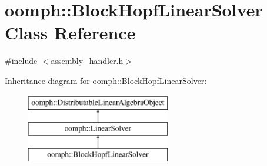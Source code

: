 \hypertarget{classoomph_1_1BlockHopfLinearSolver}{}\section{oomph\+:\+:Block\+Hopf\+Linear\+Solver Class Reference}
\label{classoomph_1_1BlockHopfLinearSolver}


{\ttfamily \#include $<$assembly\+\_\+handler.\+h$>$}

Inheritance diagram for oomph\+:\+:Block\+Hopf\+Linear\+Solver\+:\begin{figure}[H]
\begin{center}
\leavevmode
\includegraphics[height=3.000000cm]{classoomph_1_1BlockHopfLinearSolver}
\end{center}
\end{figure}
